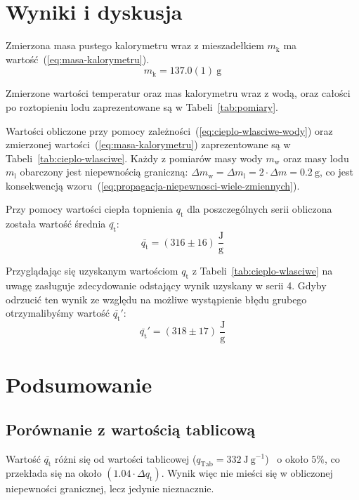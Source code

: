 \documentclass[twocolumn, a4paper, polish, 10pt]{article}
\newcommand{\mK}{\ensuremath{ m_{\mathrm{k}} }}
\newcommand{\mW}{\ensuremath{ m_{\mathrm{w}} }}
\newcommand{\mL}{\ensuremath{ m_{\mathrm{l}} }}
\newcommand{\qT}{\ensuremath{ q_{\mathrm{t}} }}
\begin{document}
\section{Wyniki i dyskusja}
Zmierzona masa pustego kalorymetru wraz z mieszadełkiem $\mK$ ma wartość~(\ref{eq:masa-kalorymetru}).
\begin{equation}
    \mK = 137.0(1)~\mathrm{g}
    \label{eq:masa-kalorymetru}
\end{equation}

Zmierzone wartości temperatur oraz mas kalorymetru wraz z wodą, oraz całości po roztopieniu lodu zaprezentowane są w Tabeli~\ref{tab:pomiary}.



Wartości obliczone przy pomocy zależności~(\ref{eq:cieplo-wlasciwe-wody}) oraz zmierzonej wartości~(\ref{eq:masa-kalorymetru}) zaprezentowane są w Tabeli~\ref{tab:cieplo-wlasciwe}.
Każdy z pomiarów masy wody $\mW$ oraz masy lodu $\mL$ obarczony jest niepewnością graniczną: $\Delta \mW = \Delta \mL = 2 \cdot \Delta m = 0.2~\mathrm{g}$, co jest konsekwencją wzoru~(\ref{eq:propagacja-niepewnosci-wiele-zmiennych}).



Przy pomocy wartości ciepła topnienia $\qT$ dla poszczególnych serii obliczona została wartość średnia $\bar{\qT}$:
\begin{displaymath}
    \bar{\qT} = (316 \pm 16)~\mathrm{\frac{J}{g}}
\end{displaymath}

Przyglądając się uzyskanym wartościom $\qT$ z Tabeli~\ref{tab:cieplo-wlasciwe} na uwagę zasługuje zdecydowanie odstający wynik uzyskany w serii 4. Gdyby odrzucić ten wynik ze względu na możliwe wystąpienie błędu grubego otrzymalibyśmy wartość $\bar{\qT}'$:
\begin{displaymath}
    \bar{\qT}' = (318 \pm 17)~\mathrm{\frac{J}{g}}
\end{displaymath}

\section{Podsumowanie}
\subsection{Porównanie z wartością tablicową}
Wartość $\bar{\qT}$ różni się od wartości tablicowej ($q_{\mathrm{Tab}}=332~\mathrm{J~g^{-1}}$)~\cite{pracownia-fizyczna-c4} o około $5\%$, co przekłada się na około $(1.04 \cdot \Delta \qT)$. Wynik więc nie mieści się w obliczonej niepewności granicznej, lecz jedynie nieznacznie.
\end{document}
